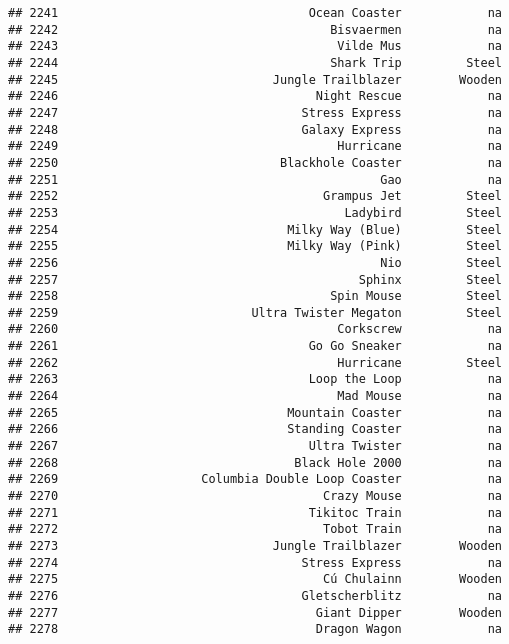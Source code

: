\documentclass[
]{article}
\begin{document}
\begin{verbatim}
## 2241                                   Ocean Coaster            na
## 2242                                      Bisvaermen            na
## 2243                                       Vilde Mus            na
## 2244                                      Shark Trip         Steel
## 2245                              Jungle Trailblazer        Wooden
## 2246                                    Night Rescue            na
## 2247                                  Stress Express            na
## 2248                                  Galaxy Express            na
## 2249                                       Hurricane            na
## 2250                               Blackhole Coaster            na
## 2251                                             Gao            na
## 2252                                     Grampus Jet         Steel
## 2253                                        Ladybird         Steel
## 2254                                Milky Way (Blue)         Steel
## 2255                                Milky Way (Pink)         Steel
## 2256                                             Nio         Steel
## 2257                                          Sphinx         Steel
## 2258                                      Spin Mouse         Steel
## 2259                           Ultra Twister Megaton         Steel
## 2260                                       Corkscrew            na
## 2261                                   Go Go Sneaker            na
## 2262                                       Hurricane         Steel
## 2263                                   Loop the Loop            na
## 2264                                       Mad Mouse            na
## 2265                                Mountain Coaster            na
## 2266                                Standing Coaster            na
## 2267                                   Ultra Twister            na
## 2268                                 Black Hole 2000            na
## 2269                    Columbia Double Loop Coaster            na
## 2270                                     Crazy Mouse            na
## 2271                                   Tikitoc Train            na
## 2272                                     Tobot Train            na
## 2273                              Jungle Trailblazer        Wooden
## 2274                                  Stress Express            na
## 2275                                     Cú Chulainn        Wooden
## 2276                                  Gletscherblitz            na
## 2277                                    Giant Dipper        Wooden
## 2278                                    Dragon Wagon            na

\end{verbatim}
\end{document}
